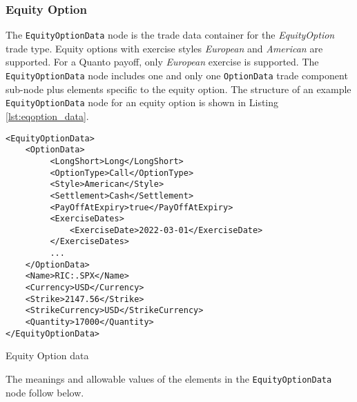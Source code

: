 \subsubsection{Equity Option}

The \lstinline!EquityOptionData!  node is the trade data container for the \emph{EquityOption} trade type.  Equity 
options with exercise styles \emph{European} and \emph{American} are supported. For a Quanto payoff, only \emph{European}
exercise is supported. The \lstinline!EquityOptionData!  node includes one and 
only one \lstinline!OptionData! trade component sub-node plus elements specific to the equity option. The structure of 
an example \lstinline!EquityOptionData! node for an equity option is shown in Listing
\ref{lst:eqoption_data}.

\begin{listing}[H]
\begin{verbatim}
<EquityOptionData>
    <OptionData>
         <LongShort>Long</LongShort>
         <OptionType>Call</OptionType>
         <Style>American</Style>
         <Settlement>Cash</Settlement>
         <PayOffAtExpiry>true</PayOffAtExpiry>
         <ExerciseDates>
             <ExerciseDate>2022-03-01</ExerciseDate>
         </ExerciseDates>
         ...
    </OptionData>
    <Name>RIC:.SPX</Name>
    <Currency>USD</Currency>
    <Strike>2147.56</Strike>
    <StrikeCurrency>USD</StrikeCurrency>
    <Quantity>17000</Quantity>
</EquityOptionData>
\end{verbatim}
\caption{Equity Option data}
\label{lst:eqoption_data}
\end{listing}

The meanings and allowable values of the elements in the \lstinline!EquityOptionData! node follow below.

